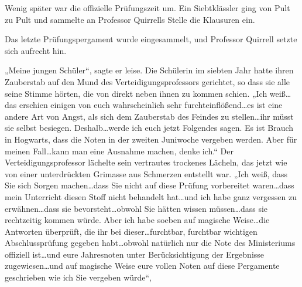Wenig später war die offizielle Prüfungszeit um. Ein Siebtklässler ging von Pult zu Pult und sammelte an Professor Quirrells Stelle die Klausuren ein.

Das letzte Prüfungspergament wurde eingesammelt, und Professor Quirrell setzte sich aufrecht hin.

„Meine jungen Schüler“, sagte er leise.
Die Schülerin im siebten Jahr hatte ihren Zauberstab auf den Mund des Verteidigungsprofessors gerichtet, so dass sie alle seine Stimme hörten, die von direkt neben ihnen zu kommen schien.
„Ich weiß…das erschien einigen von euch wahrscheinlich sehr furchteinflößend…es ist eine andere Art von Angst, als sich dem Zauberstab des Feindes zu stellen…ihr müsst sie selbst besiegen. Deshalb…werde ich euch jetzt Folgendes sagen. Es ist Brauch in Hogwarts, dass die Noten in der zweiten Juniwoche vergeben werden. Aber für meinen Fall…kann man eine Ausnahme machen, denke ich.“
Der Verteidigungsprofessor lächelte sein vertrautes trockenes Lächeln, das jetzt wie von einer unterdrückten Grimasse aus Schmerzen entstellt war.
„Ich weiß, dass Sie sich Sorgen machen…dass Sie nicht auf diese Prüfung vorbereitet waren…dass mein Unterricht diesen Stoff nicht behandelt hat…und ich habe ganz vergessen zu erwähnen…dass sie bevorsteht…obwohl Sie hätten wissen müssen…dass sie rechtzeitig kommen würde. Aber ich habe soeben auf magische Weise…die Antworten überprüft, die ihr bei dieser…furchtbar, furchtbar wichtigen Abschlussprüfung gegeben habt…obwohl natürlich nur die Note des Ministeriums offiziell ist…und eure Jahresnoten unter Berücksichtigung der Ergebnisse zugewiesen…und auf magische Weise eure vollen Noten auf diese Pergamente geschrieben wie ich Sie vergeben würde“,
